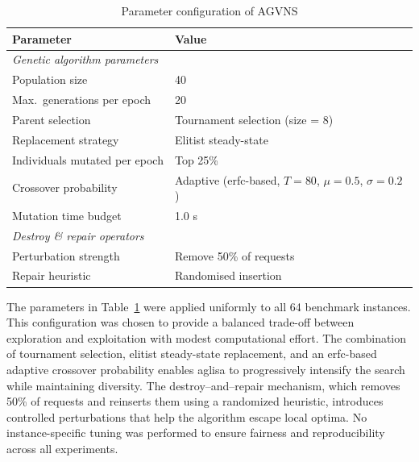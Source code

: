 \documentclass[preprint,12pt]{elsarticle}
\begin{document}
\begin{table}[htbp]
\centering
\caption{Parameter configuration of AGVNS}
\label{tab:parameters}
\begin{tabular}{l l}
\toprule
\textbf{Parameter} & \textbf{Value} \\
\midrule
\multicolumn{2}{l}{\textit{Genetic algorithm parameters}} \\
Population size & 40 \\
Max.\ generations per epoch & 20 \\
Parent selection & Tournament selection (size = 8) \\
Replacement strategy & Elitist steady-state \\
Individuals mutated per epoch & Top 25\% \\
Crossover probability & Adaptive (erfc-based, $T{=}80$, $\mu{=}0.5$, $\sigma{=}0.2$) \\
Mutation time budget & 1.0 s \\
\midrule
\multicolumn{2}{l}{\textit{Destroy \& repair operators}} \\
Perturbation strength & Remove 50\% of requests \\
Repair heuristic & Randomised insertion \\
\bottomrule
\end{tabular}
\end{table}

The parameters in Table~\ref{tab:parameters} were applied uniformly to all 64 benchmark instances. This configuration was chosen to provide a balanced trade-off between exploration and exploitation with modest computational effort. The combination of tournament selection, elitist steady-state replacement, and an erfc-based adaptive crossover probability enables \gls{aglisa} to progressively intensify the search while maintaining diversity. The destroy–and–repair mechanism, which removes 50\% of requests and reinserts them using a randomized heuristic, introduces controlled perturbations that help the algorithm escape local optima. No instance-specific tuning was performed to ensure fairness and reproducibility across all experiments.



\end{document}
